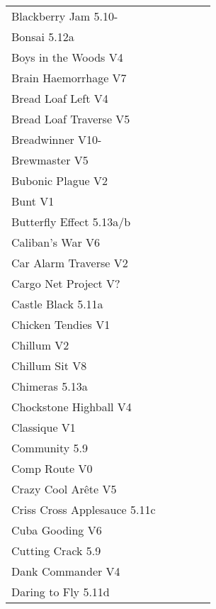 \begin{flushleft}
\begin{center}
\begin{supertabular}{p{0.76\linewidth}p{0.08\linewidth}}
Blackberry Jam 5.10- & \pageref{rt:Blackberry Jam} \\
Bonsai 5.12a & \pageref{rt:Bonsai} \\
Boys in the Woods V4 & \pageref{rt:Boys in the Woods} \\
Brain Haemorrhage V7 & \pageref{vr:Brain Haemorrhage} \\
Bread Loaf Left V4 & \pageref{rt:Bread Loaf Left} \\
Bread Loaf Traverse V5 & \pageref{rt:Bread Loaf Traverse} \\
Breadwinner V10- & \pageref{rt:Breadwinner} \\
Brewmaster V5 & \pageref{rt:Brewmaster} \\
Bubonic Plague V2 & \pageref{rt:Bubonic Plague} \\
Bunt V1 & \pageref{rt:Bunt} \\
Butterfly Effect 5.13a/b & \pageref{rt:Butterfly Effect} \\
Caliban's War V6 & \pageref{rt:Caliban's War} \\
Car Alarm Traverse V2 & \pageref{rt:Car Alarm Traverse} \\
Cargo Net Project V? & \pageref{rt:Cargo Net Project} \\
Castle Black 5.11a & \pageref{rt:Castle Black} \\
Chicken Tendies V1 & \pageref{rt:Chicken Tendies} \\
Chillum V2 & \pageref{rt:Chillum} \\
Chillum Sit V8 & \pageref{vr:Chillum Sit} \\
Chimeras 5.13a & \pageref{rt:Chimeras} \\
Chockstone Highball V4 & \pageref{rt:Chockstone Highball} \\
Classique V1 & \pageref{rt:Classique} \\
Community 5.9 & \pageref{rt:Community} \\
Comp Route V0 & \pageref{rt:Comp Route} \\
Crazy Cool Arête V5 & \pageref{rt:Crazy Cool Arête} \\
Criss Cross Applesauce 5.11c & \pageref{rt:Criss Cross Applesauce} \\
Cuba Gooding V6 & \pageref{rt:Cuba Gooding} \\
Cutting Crack 5.9 & \pageref{rt:Cutting Crack} \\
Dank Commander V4 & \pageref{rt:Dank Commander} \\
Daring to Fly 5.11d & \pageref{rt:Daring to Fly} \\

\end{supertabular}
\end{center}
\end{flushleft}
